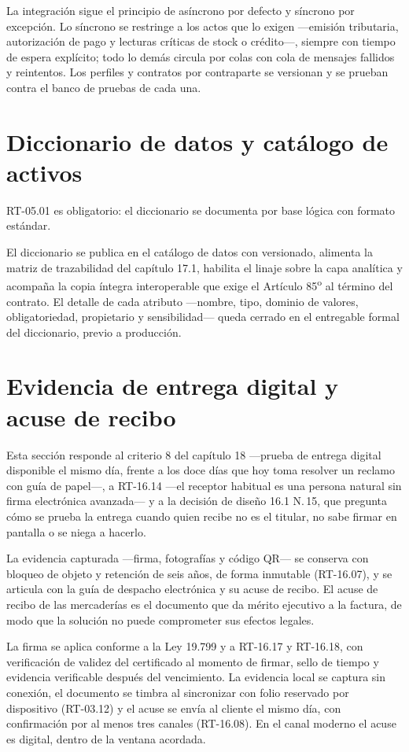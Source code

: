 La integración sigue el principio de asíncrono por defecto y síncrono por
excepción.  Lo síncrono se restringe a los actos que lo exigen ---emisión
tributaria, autorización de pago y lecturas críticas de stock o crédito---,
siempre con tiempo de espera explícito; todo lo demás circula por colas con
cola de mensajes fallidos y reintentos.  Los perfiles y contratos por
contraparte se versionan y se prueban contra el banco de pruebas de cada una.

\section{Diccionario de datos y catálogo de activos}
\label{sec:diccionario}

RT-05.01 es obligatorio: el diccionario se documenta por base lógica con
formato estándar.


El diccionario se publica en el catálogo de datos con versionado, alimenta la
matriz de trazabilidad del capítulo 17.1, habilita el linaje sobre la capa
analítica y acompaña la copia íntegra interoperable que exige el Artículo
85\textsuperscript{o} al término del contrato.  El detalle de cada atributo
---nombre, tipo, dominio de valores, obligatoriedad, propietario y
sensibilidad--- queda cerrado en el entregable formal del diccionario, previo a
producción.

\section{Evidencia de entrega digital y acuse de recibo}
\label{sec:evidencia}

Esta sección responde al criterio 8 del capítulo 18 ---prueba de entrega
digital disponible el mismo día, frente a los doce días que hoy toma resolver
un reclamo con guía de papel---, a RT-16.14 ---el receptor habitual es una
persona natural sin firma electrónica avanzada--- y a la decisión de diseño
16.1 N.\textdegree\,15, que pregunta cómo se prueba la entrega cuando quien
recibe no es el titular, no sabe firmar en pantalla o se niega a hacerlo.


La evidencia capturada ---firma, fotografías y código QR--- se conserva con
bloqueo de objeto y retención de seis años, de forma inmutable (RT-16.07), y se
articula con la guía de despacho electrónica y su acuse de recibo.  El acuse de
recibo de las mercaderías es el documento que da mérito ejecutivo a la factura,
de modo que la solución no puede comprometer sus efectos legales.

La firma se aplica conforme a la Ley 19.799 y a RT-16.17 y RT-16.18, con
verificación de validez del certificado al momento de firmar, sello de tiempo y
evidencia verificable después del vencimiento.  La evidencia local se captura
sin conexión, el documento se timbra al sincronizar con folio reservado por
dispositivo (RT-03.12) y el acuse se envía al cliente el mismo día, con
confirmación por al menos tres canales (RT-16.08).  En el canal moderno el acuse
es digital, dentro de la ventana acordada.
